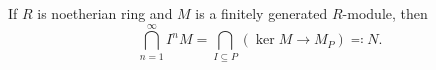 If $R$ is noetherian ring and $M$ is a finitely generated $R$-module,
then
\[ \bigcap_{n=1}^\infty I^nM = \bigcap_{I \subseteq P}(\ker M\to M_P) \eqqcolon N. \]

